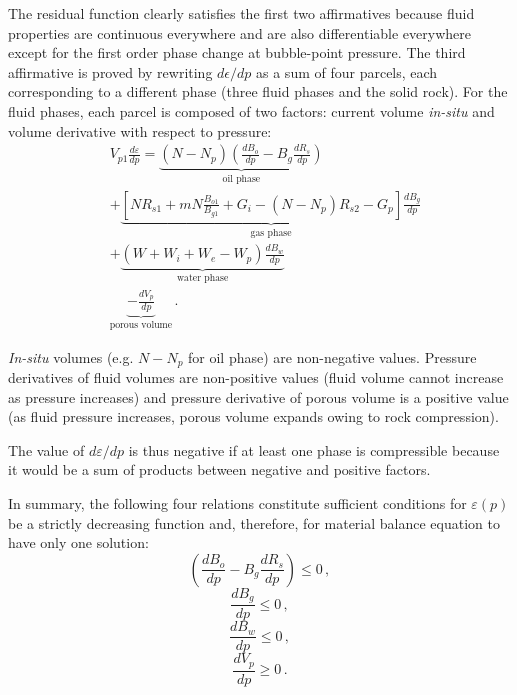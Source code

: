 \documentclass[authoryear,preprint,review,11pt]{elsarticle}
\begin{document}
The residual function clearly satisfies the first two affirmatives because fluid properties are continuous everywhere and are also differentiable everywhere except for the first order phase change at bubble-point pressure.
The third affirmative is proved by rewriting $d\epsilon/dp$ as a sum of four parcels, each corresponding to a different phase (three fluid phases and the solid rock). For the fluid phases, each parcel is composed of two factors: current volume \textit{in-situ} and volume derivative with respect to pressure:
\begin{equation}
\begin{split}
&V_{p1}\frac{d\varepsilon}{dp}=\underbrace{\left(N-N_p\right) \left(\frac{dB_o}{dp} - B_g \frac{dR_s}{dp} \right)}_\text{oil phase}\\
&+\underbrace{\left[N R_{s1}+mN\frac{B_{o1}}{B_{g1}}+G_i-\left(N-N_p\right)R_{s2}-G_p\right] \frac{dB_g}{dp}}_\text{gas phase}\\
&+\underbrace{\left(W + W_i+W_e-W_p\right)\frac{dB_w}{dp}}_\text{water phase}\\
&\underbrace{-\frac{dV_p}{dp}}_\text{porous volume}\, .
\end{split}
\end{equation}

\textit{In-situ} volumes (e.g. $N-N_p$ for oil phase) are non-negative values. Pressure derivatives of fluid volumes are non-positive values (fluid volume cannot increase as pressure increases) and pressure derivative of porous volume is a positive value (as fluid pressure increases, porous volume expands owing to rock compression).

The value of $d\varepsilon/dp$ is thus negative if at least one phase is compressible because it would be a sum of products between negative and positive factors.

In summary, the following four relations constitute sufficient conditions for $\varepsilon(p)$ be a strictly decreasing function and, therefore, for material balance equation to have only one solution:
\begin{equation}\label{eq: PVTH1}
\left(\frac{dB_o}{dp} - B_g \frac{dR_s}{dp} \right) \leq 0 \, ,
\end{equation}
\begin{equation}\label{eq: PVTH2}
\frac{dB_g}{dp} \leq 0 \, ,
\end{equation}
\begin{equation}\label{eq: PVTH3}
\frac{dB_w}{dp} \leq 0 \, ,
\end{equation}
\begin{equation}\label{eq: PVTH4}
\frac{dV_p}{dp} \geq 0 \, .
\end{equation}
\end{document}
